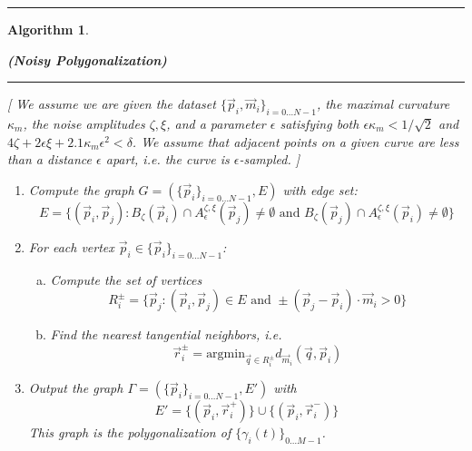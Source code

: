 \documentclass{article}
\newtheorem{algo}{Algorithm}
\numberwithin{cntr}{section}
\numberwithin{equation}{section}
\newcommand{\vp}[0]{{\vec{p}}}
\newcommand{\vq}[0]{{\vec{q}}}
\newcommand{\vr}[0]{{\vec{r}}}
\newcommand{\vm}[0]{{\vec{m}}}
\newcommand{\Oto}[1]{{0 \ldots #1-1}}
\newcommand{\OtoN}{{0 \ldots N-1}}
\newcommand{\pointData}{{ \{ \vp_{i} \}_{i=\OtoN} }}
\newcommand{\allData}{{ \{ \vp_{i}, \vm_{i} \}_{i=\OtoN} }}
\newcommand{\curveSet}{{ \{ \gamma_i(t) \}_{\Oto{M}}}}
\newcommand{\ball}[2]{ { B_{#1}(#2) } }
\newcommand{\curvemax}{{\kappa_{m}}}
\newcommand{\curvesep}{{\delta}}
\newcommand{\pointNoise}{{\zeta}}
\newcommand{\tanNoise}{{\xi}}
\newcommand{\nallowed}[2]{ { A^{\pointNoise, \tanNoise}_{#1}(#2) } }
\begin{document}
\hrule
\begin{algo}
  \label{algo:polygonalizationNoisy}
  \begin{center} {\bf (Noisy Polygonalization)}
  \end{center}

\vspace{.1in}

\hrule

\vspace{.2in}

[ We assume we are given the dataset $\allData$, the maximal curvature
$\curvemax$, the noise amplitudes $\pointNoise, \tanNoise$, and a
parameter $\epsilon$ satisfying both $\epsilon \curvemax < 1/\sqrt{2}$ and
$4 \pointNoise + 2 \epsilon \tanNoise + 2.1 \curvemax \epsilon^{2} < \curvesep$. We assume that adjacent points on a given curve
are less than a distance $\epsilon$ apart, i.e. the curve is
$\epsilon$-sampled. ]

\vspace{.1in}

\begin{enumerate}
  \item Compute the graph $G = (\pointData, E)$ with edge set:
    \begin{equation}
      \label{eq:noisyConditionForCheckingIfEdgeConnectionIsPlausible}
      E = \{ (\vp_{i},\vp_{j}) : \ball{\pointNoise}{\vp_{i}} \cap \nallowed{\epsilon}{\vp_{j}} \neq \emptyset  \textrm{~and~} \ball{\pointNoise}{\vp_{j}} \cap \nallowed{\epsilon}{\vp_{i}} \neq \emptyset \}
    \end{equation}
  \item For each vertex $\vp_{i} \in \pointData$:
    \begin{enumerate}[a.]
    \item Compute the set of vertices
      \begin{equation*}
        R^{\pm}_{i} = \{ \vp_{j} : (\vp_{i}, \vp_{j}) \in E \textrm{~and~} \pm (\vp_{j}-\vp_{i}) \cdot \vm_{i} > 0 \}
      \end{equation*}
    \item Find the nearest tangential neighbors, i.e.
      \begin{equation*}
        \vr^{\pm}_{i} = \textrm{argmin}_{\vq \in R^{\pm}_{i}} d_{\vm_{i}}(\vq, \vp_{i})
      \end{equation*}
    \end{enumerate}
  \item Output the graph $\Gamma = ( \pointData, E')$ with
    \begin{equation*}
      E' = \{ (\vp_{i}, \vr^{+}_{i}) \} \cup \{ (\vp_{i}, \vr^{-}_{i}) \}
    \end{equation*}
    This graph is the polygonalization of $\curveSet$.
  \end{enumerate}

\end{algo}
\end{document}

